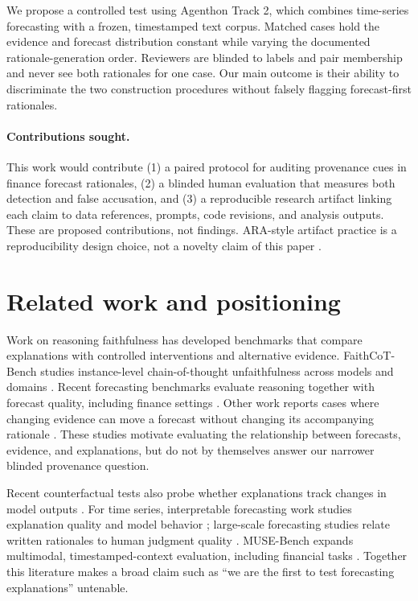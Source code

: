 \documentclass[10pt]{article}
\begin{document}
We propose a controlled test using Agenthon Track 2, which combines time-series forecasting with a frozen, timestamped text corpus. Matched cases hold the evidence and forecast distribution constant while varying the documented rationale-generation order. Reviewers are blinded to labels and pair membership and never see both rationales for one case. Our main outcome is their ability to discriminate the two construction procedures without falsely flagging forecast-first rationales.

\paragraph{Contributions sought.} This work would contribute (1) a paired protocol for auditing provenance cues in finance forecast rationales, (2) a blinded human evaluation that measures both detection and false accusation, and (3) a reproducible research artifact linking each claim to data references, prompts, code revisions, and analysis outputs. These are proposed contributions, not findings. ARA-style artifact practice is a reproducibility design choice, not a novelty claim of this paper \cite{liu2026ara}.

\section{Related work and positioning}
Work on reasoning faithfulness has developed benchmarks that compare explanations with controlled interventions and alternative evidence. FaithCoT-Bench studies instance-level chain-of-thought unfaithfulness across models and domains \cite{faithcot}. Recent forecasting benchmarks evaluate reasoning together with forecast quality, including finance settings \cite{tfrbench}. Other work reports cases where changing evidence can move a forecast without changing its accompanying rationale \cite{knowdontsay}. These studies motivate evaluating the relationship between forecasts, evidence, and explanations, but do not by themselves answer our narrower blinded provenance question.

Recent counterfactual tests also probe whether explanations track changes in model outputs \cite{counterfactualcot}. For time series, interpretable forecasting work studies explanation quality and model behavior \cite{ibforecast}; large-scale forecasting studies relate written rationales to human judgment quality \cite{fri}. MUSE-Bench expands multimodal, timestamped-context evaluation, including financial tasks \cite{muse}. Together this literature makes a broad claim such as “we are the first to test forecasting explanations” untenable.
\end{document}
